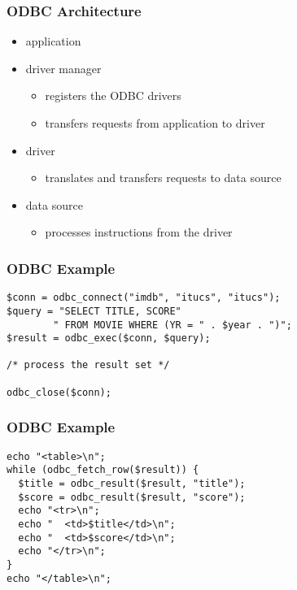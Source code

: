 \documentclass[dvipsnames]{beamer}
\theoremstyle{plain}
\begin{document}
\begin{frame}
  \frametitle{ODBC Architecture}

  \begin{itemize}
    \item application

    \pause
    \item driver manager
    \begin{itemize}
      \item registers the ODBC drivers
      \item transfers requests from application to driver
    \end{itemize}

    \pause
    \item driver
    \begin{itemize}
      \item translates and transfers requests to data source
    \end{itemize}

    \pause
    \item data source
    \begin{itemize}
      \item processes instructions from the driver
    \end{itemize}
  \end{itemize}
\end{frame}

\begin{frame}[fragile]
  \frametitle{ODBC Example}

  \begin{example}[PHP]
    \begin{lstlisting}[language=ExtendedPHP]
$conn = odbc_connect("imdb", "itucs", "itucs");
$query = "SELECT TITLE, SCORE"
        " FROM MOVIE WHERE (YR = " . $year . ")";
$result = odbc_exec($conn, $query);

/* process the result set */

odbc_close($conn);
    \end{lstlisting}
  \end{example}
\end{frame}

\begin{frame}[fragile]
  \frametitle{ODBC Example}

  \begin{example}
    \begin{lstlisting}[language=ExtendedPHP]
echo "<table>\n";
while (odbc_fetch_row($result)) {
  $title = odbc_result($result, "title");
  $score = odbc_result($result, "score");
  echo "<tr>\n";
  echo "  <td>$title</td>\n";
  echo "  <td>$score</td>\n";
  echo "</tr>\n";
}
echo "</table>\n";
    \end{lstlisting}
  \end{example}
\end{frame}
\end{document}
